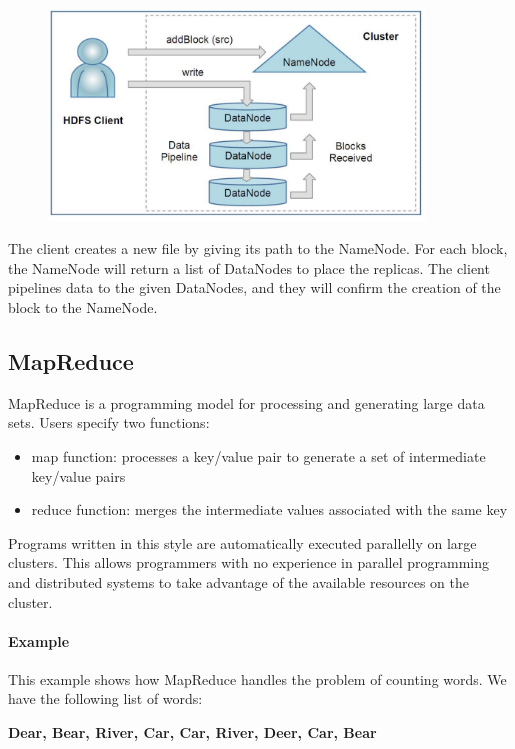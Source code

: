 \begin{figure}[H]
	\includegraphics[width=100mm, keepaspectratio]{figures/hdfs_client.png}
	\centering
\end{figure}
The client creates a new file by giving its path to the NameNode. For each block, the NameNode will return a list of DataNodes to place the replicas. The client pipelines data to the given DataNodes, and they will confirm the creation of the block to the NameNode.
\subsection{MapReduce \cite{Dean:2004:MSD:1251254.1251264}}
MapReduce is a programming model for processing and generating large data sets. Users specify two functions:
\begin{itemize}
	\item map function: processes a key/value pair to generate a set of intermediate key/value pairs
	\item reduce function: merges the intermediate values associated with the same key
\end{itemize}

Programs written in this style are automatically executed parallelly  on large clusters. This allows programmers with no experience in parallel programming and distributed systems to take advantage of the available resources on the cluster.
\paragraph{Example \cite{MapReduce-example}}
This example shows how MapReduce handles the problem of counting words. We have the following list of words: 
\begin{center}
	\textbf{Dear, Bear, River, Car, Car, River, Deer, Car, Bear}
\end{center}

